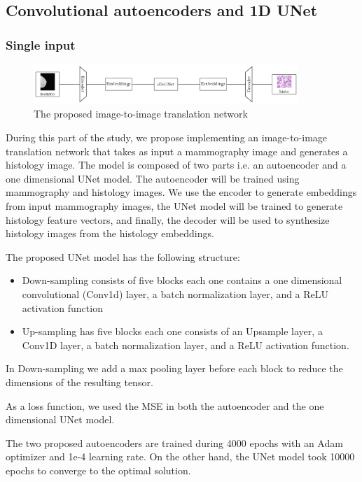 \documentclass[11pt]{article}
\begin{document}
\subsection{Convolutional autoencoders and 1D UNet}
\subsubsection{Single input}

\begin{figure}[h!]
  \centering
  \includegraphics[width=10cm]{Single_input.pdf}

\caption{The proposed image-to-image translation network}
\end{figure}


During this part of the study, we propose implementing an image-to-image translation network that takes as input a mammography image and generates a histology image. The model is composed of two parts i.e. an autoencoder and a one dimensional UNet model. The autoencoder will be trained using mammography and histology images. We use the encoder to generate embeddings from input mammography images, the UNet model will be trained to generate histology feature vectors, and finally, the decoder will be used to synthesize histology images from the histology embeddings.

The proposed UNet model has the following structure:
\begin{itemize}
  \item Down-sampling consists of five blocks each one contains a one dimensional convolutional (Conv1d) layer, a batch normalization layer, and a ReLU activation function
  \item Up-sampling has five blocks each one consists of an Upsample layer, a Conv1D layer, a batch normalization layer, and a ReLU activation function. 
\end{itemize}

In Down-sampling we add a max pooling layer before each block to reduce the dimensions of the resulting tensor. 

As a loss function, we used the MSE in both the autoencoder and the one dimensional UNet model. 

The two proposed autoencoders are trained during 4000 epochs with an Adam optimizer and 1e-4 learning rate. On the other hand, the UNet model took 10000 epochs to converge to the optimal solution. 
\end{document}
